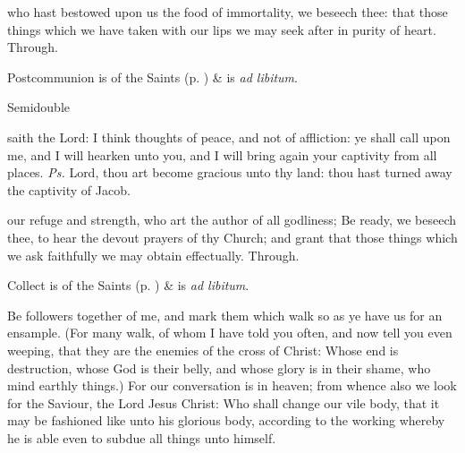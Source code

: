 
\postcommunion
{} who hast bestowed upon us the food of immortality, we beseech thee: that those things which we have taken with our lips we may seek after in purity of heart. Through.
\begin{rubric}
     Postcommunion is of the Saints (p. \pageref{SPSaints}) \&  is \emph{ad libitum}.
\end{rubric}

\begin{inhead}
{Semidouble}
\end{inhead}

\properantiphonfix

\introit
{} saith the Lord: I think thoughts of peace, and not of affliction: ye shall call upon me, and I will hearken unto you, and I will bring again your captivity from all places. \textit{Ps.} Lord, thou art become gracious unto thy land: thou hast turned away the captivity of Jacob.

\collect
{} our refuge and strength, who art the author of all godliness; Be ready, we beseech thee, to hear the devout prayers of thy Church; and grant that those things which we ask faithfully we may obtain effectually. Through.
\begin{rubric}
     Collect is of the Saints (p. \pageref{SPSaints}) \&  is \emph{ad libitum}.
\end{rubric}

 Be followers together of me, and mark them which walk so as ye have us for an ensample. (For many walk, of whom I have told you often, and now tell you even weeping, that they are the enemies of the cross of Christ: Whose end is destruction, whose God is their belly, and whose glory is in their shame, who mind earthly things.) For our conversation is in heaven; from whence also we look for the Saviour, the Lord Jesus Christ: Who shall change our vile body, that it may be fashioned like unto his glorious body, according to the working whereby he is able even to subdue all things unto himself.


